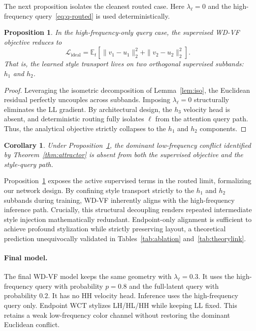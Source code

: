 \documentclass[letterpaper]{article}
\newtheorem{proposition}{Proposition}
\newtheorem{corollary}{Corollary}
\begin{document}
The next proposition isolates the cleanest routed case.
Here $\lambda_\ell=0$ and the high-frequency query~\eqref{eq:q-routed} is used deterministically.

\begin{proposition}
\label{thm:blockdiag}
In the high-frequency-only query case, the supervised WD-VF objective reduces to
\begin{equation}
\mathcal L_{\mathrm{ideal}}
=
\mathbb E_t\!\left[\|v_1-u_1\|_2^2 + \|v_2-u_2\|_2^2\right].
\label{eq:objdecomp}
\end{equation}
That is, the learned style transport lives on two orthogonal supervised subbands: $h_1$ and $h_2$.
\end{proposition}
\begin{proof}
Leveraging the isometric decomposition of Lemma~\ref{lem:iso}, the Euclidean residual perfectly uncouples across subbands. Imposing $\lambda_\ell=0$ structurally eliminates the LL gradient. By architectural design, the $h_3$ velocity head is absent, and deterministic routing fully isolates $\ell$ from the attention query path. Thus, the analytical objective strictly collapses to the $h_1$ and $h_2$ components.
\end{proof}

\begin{corollary}
\label{cor:escape}
Under Proposition~\ref{thm:blockdiag}, the dominant low-frequency conflict identified by Theorem~\ref{thm:attractor} is absent from both the supervised objective and the style-query path.
\end{corollary}

Proposition~\ref{thm:blockdiag} exposes the active supervised terms in the routed limit, formalizing our network design. 
By confining style transport strictly to the $h_1$ and $h_2$ subbands during training, WD-VF inherently aligns with the high-frequency inference path.
Crucially, this structural decoupling renders repeated intermediate style injection mathematically redundant. 
Endpoint-only alignment is sufficient to achieve profound stylization while strictly preserving layout, a theoretical prediction unequivocally validated in Tables~\ref{tab:ablation} and~\ref{tab:theorylink}.

\paragraph{Final model.}
The final WD-VF model keeps the same geometry with $\lambda_\ell=0.3$.
It uses the high-frequency query with probability $p=0.8$ and the full-latent query with probability $0.2$.
It has no HH velocity head.
Inference uses the high-frequency query only.
Endpoint WCT stylizes LH/HL/HH while keeping LL fixed.
This retains a weak low-frequency color channel without restoring the dominant Euclidean conflict.
\end{document}
